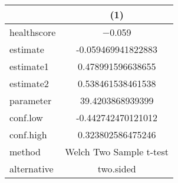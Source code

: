 \begin{table}
\centering
\begin{tabular}[t]{lc}
\toprule
  & (1)\\
\midrule
healthscore & \num{-0.059}\\
\midrule
estimate & -0.059469941822883\\
estimate1 & 0.478991596638655\\
estimate2 & 0.538461538461538\\
parameter & 39.4203868939399\\
conf.low & -0.442742470121012\\
conf.high & 0.323802586475246\\
method & Welch Two Sample t-test\\
alternative & two.sided\\
\bottomrule
\end{tabular}
\end{table}
